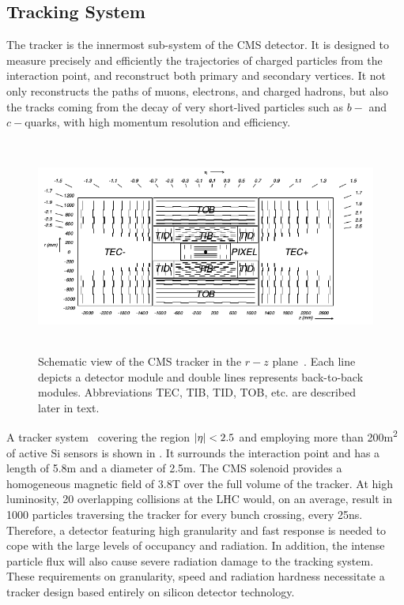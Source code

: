 \subsection{Tracking System}
The tracker is the innermost sub-system of the CMS detector. It is designed to measure precisely and efficiently the trajectories of charged 
particles from the interaction point, and reconstruct both primary and secondary vertices. It not only reconstructs the paths of muons, 
electrons, and charged hadrons, but also the tracks coming from the decay of very short-lived particles such as $b-$ and $c-$quarks, with high momentum resolution and efficiency.
\begin{figure}[h!]
\centering
\includegraphics[width=14cm,height=7cm]{ch2/figures/TrackerLayout.png}
\caption{ Schematic view of the CMS tracker in the $r-z$ plane~\cite{Chatrchyan:2008aa}. Each line depicts a detector module and double lines represents back-to-back modules. Abbreviations TEC, TIB, TID, TOB, etc. are described later in text.}
\label{fig:trackerLayout}
\end{figure}

A tracker system~\cite{Chatrchyan:2008aa,Karimaki:368412} covering the region $\lvert \eta \rvert<2.5$ and employing more than 200\unit{m^2} of active Si 
sensors is shown in \fig{\ref{fig:trackerLayout}}. It surrounds the interaction point and has a length of 5.8\unit{m} and a diameter of 2.5\unit{m}. 
The CMS solenoid provides a homogeneous magnetic field of 3.8\unit{T} over the full volume of the tracker. At high luminosity, 20 overlapping \pp 
collisions at the LHC would, on an average, result in 1000 particles traversing the tracker for every bunch crossing, \ie every 25\unit{ns}. Therefore, 
a detector featuring high granularity and fast response is needed to cope with the large levels of occupancy and radiation. In addition, the intense 
particle flux will also cause severe radiation damage to the tracking system. These requirements on granularity, speed and radiation hardness 
necessitate a tracker design based entirely on silicon detector technology.


